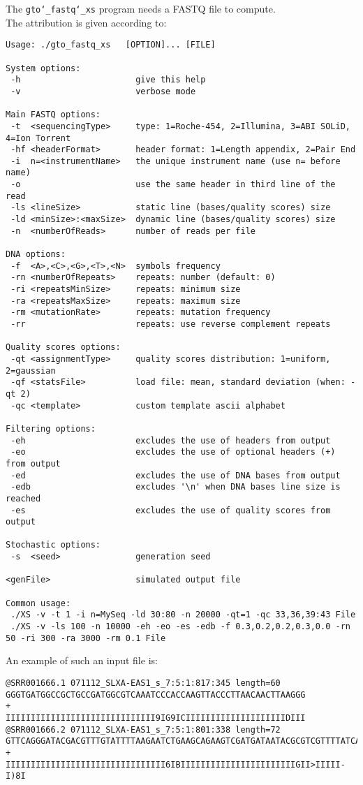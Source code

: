 The \texttt{gto\char`_fastq\char`_xs} program needs a FASTQ file to compute.\\
The attribution is given according to:
\begin{lstlisting}
Usage: ./gto_fastq_xs   [OPTION]... [FILE] 

System options:
 -h                       give this help
 -v                       verbose mode

Main FASTQ options:
 -t  <sequencingType>     type: 1=Roche-454, 2=Illumina, 3=ABI SOLiD, 4=Ion Torrent
 -hf <headerFormat>       header format: 1=Length appendix, 2=Pair End
 -i  n=<instrumentName>   the unique instrument name (use n= before name)
 -o                       use the same header in third line of the read
 -ls <lineSize>           static line (bases/quality scores) size
 -ld <minSize>:<maxSize>  dynamic line (bases/quality scores) size
 -n  <numberOfReads>      number of reads per file

DNA options:
 -f  <A>,<C>,<G>,<T>,<N>  symbols frequency
 -rn <numberOfRepeats>    repeats: number (default: 0)
 -ri <repeatsMinSize>     repeats: minimum size
 -ra <repeatsMaxSize>     repeats: maximum size
 -rm <mutationRate>       repeats: mutation frequency
 -rr                      repeats: use reverse complement repeats

Quality scores options:
 -qt <assignmentType>     quality scores distribution: 1=uniform, 2=gaussian
 -qf <statsFile>          load file: mean, standard deviation (when: -qt 2)
 -qc <template>           custom template ascii alphabet

Filtering options:
 -eh                      excludes the use of headers from output
 -eo                      excludes the use of optional headers (+) from output
 -ed                      excludes the use of DNA bases from output
 -edb                     excludes '\n' when DNA bases line size is reached
 -es                      excludes the use of quality scores from output

Stochastic options:
 -s  <seed>               generation seed

<genFile>                 simulated output file

Common usage:
 ./XS -v -t 1 -i n=MySeq -ld 30:80 -n 20000 -qt=1 -qc 33,36,39:43 File
 ./XS -v -ls 100 -n 10000 -eh -eo -es -edb -f 0.3,0.2,0.2,0.3,0.0 -rn 50 -ri 300 -ra 3000 -rm 0.1 File
\end{lstlisting}
An example of such an input file is:
\begin{lstlisting}
@SRR001666.1 071112_SLXA-EAS1_s_7:5:1:817:345 length=60
GGGTGATGGCCGCTGCCGATGGCGTCAAATCCCACCAAGTTACCCTTAACAACTTAAGGG
+
IIIIIIIIIIIIIIIIIIIIIIIIIIIIII9IG9ICIIIIIIIIIIIIIIIIIIIIDIII
@SRR001666.2 071112_SLXA-EAS1_s_7:5:1:801:338 length=72
GTTCAGGGATACGACGTTTGTATTTTAAGAATCTGAAGCAGAAGTCGATGATAATACGCGTCGTTTTATCAT
+
IIIIIIIIIIIIIIIIIIIIIIIIIIIIIIII6IBIIIIIIIIIIIIIIIIIIIIIIIGII>IIIII-I)8I
\end{lstlisting}


